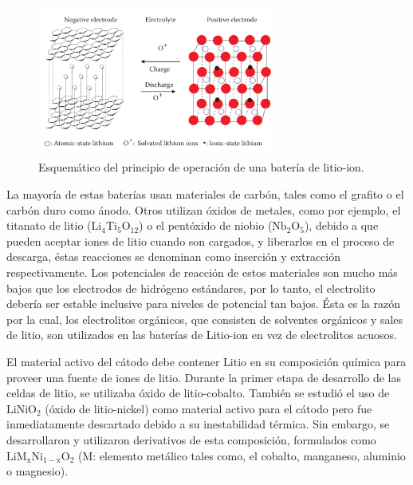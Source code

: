 \documentclass[10pt,a4paper]{article}
\begin{document}
\begin{figure}[h!]
    \begin{center}
	\includegraphics[width=0.7\textwidth]{prin_litio}
	\caption{Esquem\'atico del principio de operaci\'on de una bater\'ia de
	litio-ion.}
	\label{op_lithium-ion}
    \end{center}
\end{figure}

\noindent La mayoría de estas baterías usan materiales de carbón, tales como el
grafito o el carbón duro como ánodo. Otros utilizan óxidos de metales, como por
ejemplo, el titanato de litio ($\mathrm{Li_4Ti_5O_{12}}$) o el pentóxido de
niobio ($\mathrm{Nb_2O_5}$), debido a que pueden aceptar iones de litio cuando
son cargados, y liberarlos en el proceso de descarga, \'estas reacciones se
denominan como inserción y extracción respectivamente. Los potenciales de
reacción de estos materiales son mucho más bajos que los electrodos de hidrógeno
estándares, por lo tanto, el electrolito debería ser estable inclusive para
niveles de potencial tan bajos. Ésta es la razón por la cual, los electrolitos
orgánicos, que consisten de solventes orgánicos y sales de litio, son utilizados
en las baterías de Litio-ion en vez de electrolitos acuosos.

\noindent El material activo del cátodo debe contener Litio en su composición
química para proveer una fuente de iones de litio. Durante la primer etapa de
desarrollo de las celdas de litio, se utilizaba \'oxido de litio-cobalto.
También se estudió el uso de $\mathrm{LiNiO_2}$ (\'oxido de litio-nickel) como 
material activo para el cátodo pero fue inmediatamente descartado debido a su 
inestabilidad térmica. Sin embargo, se desarrollaron y utilizaron derivativos de 
esta composición, formulados como $\mathrm{LiM_xNi_{1-x}O_2}$  
(M: elemento metálico tales como, el cobalto, manganeso, aluminio o magnesio).

\newpage
\end{document}
